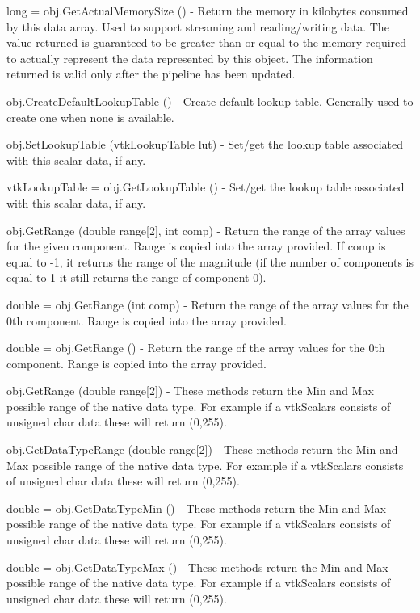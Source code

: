 \begin{DoxyItemize}
\item {\ttfamily long = obj.\-Get\-Actual\-Memory\-Size ()} -\/ Return the memory in kilobytes consumed by this data array. Used to support streaming and reading/writing data. The value returned is guaranteed to be greater than or equal to the memory required to actually represent the data represented by this object. The information returned is valid only after the pipeline has been updated.  
\item {\ttfamily obj.\-Create\-Default\-Lookup\-Table ()} -\/ Create default lookup table. Generally used to create one when none is available.  
\item {\ttfamily obj.\-Set\-Lookup\-Table (vtk\-Lookup\-Table lut)} -\/ Set/get the lookup table associated with this scalar data, if any.  
\item {\ttfamily vtk\-Lookup\-Table = obj.\-Get\-Lookup\-Table ()} -\/ Set/get the lookup table associated with this scalar data, if any.  
\item {\ttfamily obj.\-Get\-Range (double range\mbox{[}2\mbox{]}, int comp)} -\/ Return the range of the array values for the given component. Range is copied into the array provided. If comp is equal to -\/1, it returns the range of the magnitude (if the number of components is equal to 1 it still returns the range of component 0).  
\item {\ttfamily double = obj.\-Get\-Range (int comp)} -\/ Return the range of the array values for the 0th component. Range is copied into the array provided.  
\item {\ttfamily double = obj.\-Get\-Range ()} -\/ Return the range of the array values for the 0th component. Range is copied into the array provided.  
\item {\ttfamily obj.\-Get\-Range (double range\mbox{[}2\mbox{]})} -\/ These methods return the Min and Max possible range of the native data type. For example if a vtk\-Scalars consists of unsigned char data these will return (0,255).  
\item {\ttfamily obj.\-Get\-Data\-Type\-Range (double range\mbox{[}2\mbox{]})} -\/ These methods return the Min and Max possible range of the native data type. For example if a vtk\-Scalars consists of unsigned char data these will return (0,255).  
\item {\ttfamily double = obj.\-Get\-Data\-Type\-Min ()} -\/ These methods return the Min and Max possible range of the native data type. For example if a vtk\-Scalars consists of unsigned char data these will return (0,255).  
\item {\ttfamily double = obj.\-Get\-Data\-Type\-Max ()} -\/ These methods return the Min and Max possible range of the native data type. For example if a vtk\-Scalars consists of unsigned char data these will return (0,255).  

\end{DoxyItemize}
